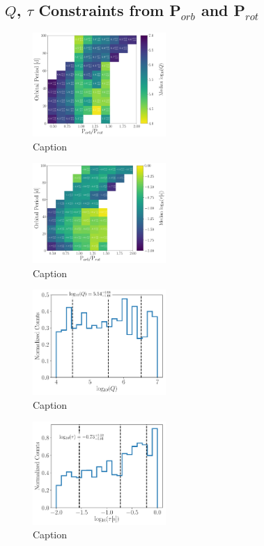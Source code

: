 \documentclass[twocolumn]{aastex61}
\begin{document}
\subsection{$Q$, $\tau$ Constraints from P$_{orb}$ and P$_{rot}$} \label{sec:qTau}

\begin{figure}
	\includegraphics[width=0.45\textwidth]{../Plots/porbProtPorbQHist.pdf}
   \caption{Caption}%
    \label{fig:qmap}%
\end{figure}

\begin{figure}
	\includegraphics[width=0.45\textwidth]{../Plots/porbProtPorbTauHist.pdf}
   \caption{Caption}%
    \label{fig:taumap}%
\end{figure}

\begin{figure}
	\includegraphics[width=0.45\textwidth]{../Plots/qLurie.pdf}
   \caption{Caption}%
    \label{fig:qLurie}%
\end{figure}

\begin{figure}
	\includegraphics[width=0.45\textwidth]{../Plots/tauLurie.pdf}
   \caption{Caption}%
    \label{fig:tauLurie}%
\end{figure}
\end{document}
